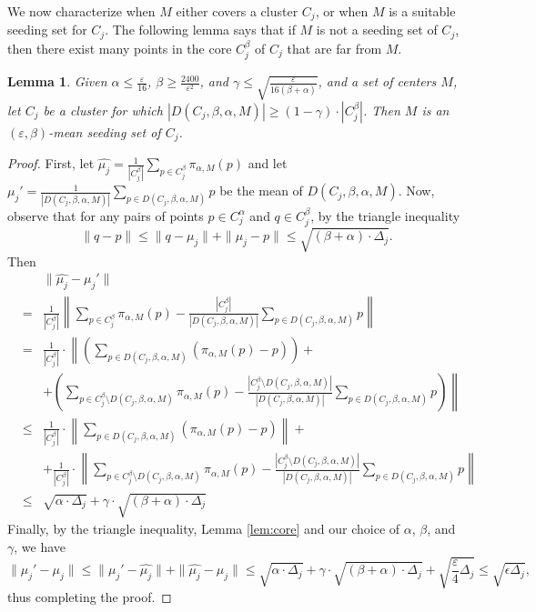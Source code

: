 \documentclass[11pt]{article}
\newtheorem{lemma}[theorem]{Lemma}
\begin{document}
We now characterize when $M$ either covers a cluster $C_j$, or when $M$ is a suitable seeding set for $C_j$. The following lemma says that if $M$ is not a seeding set of $C_j$, then there exist many points in the core $C_j^\beta$ of $C_j$ that are far from $M$.

\begin{lemma}
\label{lem:closecore}
    Given $\alpha\leq \frac{\varepsilon}{16}$, $\beta \geq \frac{2400}{\varepsilon^{2}}$, and $\gamma\leq \sqrt{\frac{\varepsilon}{16(\beta+\alpha)}}$,
    and a set of centers $M$, let $C_j$ be a cluster for which $|D(C_j,\beta,\alpha,M)| \geq (1-\gamma)\cdot |C_j^\beta|$. 
    Then $M$ is an $(\varepsilon,\beta)$-mean seeding set of $C_j$. 
\end{lemma}
\begin{proof}
    First, let $\hat{\mu_j} = \frac{1}{|C_j^\beta|}\sum_{p\in C_j^\beta}\pi_{\alpha,M}(p)$ and let 
    $\mu_j' = \frac{1}{|D(C_j,\beta,\alpha,M)|}\sum_{p\in D(C_j,\beta,\alpha,M)}p$ be the mean of $D(C_j,\beta,\alpha,M)$. 
    Now, observe that for any pairs of points $p\in C_j^\alpha$ and $q\in C_j^\beta$, by the triangle inequality 
    $$
    \|q-p\|\leq \|q - \mu_j\| + \|\mu_j - p\|\le \sqrt{(\beta+\alpha)\cdot \Delta_j}.
    $$
    Then
    \begin{eqnarray*}
        & & \|\hat{\mu_j}- \mu_j'\| \\
        & = & \frac{1}{|C_j^\beta|} \left\|\sum_{p\in C_j^\beta}\pi_{\alpha,M}(p) - \frac{|C_j^\beta|}{|D(C_j,\beta,\alpha,M)|}\sum_{p\in D(C_j,\beta,\alpha,M)}p\right\|\\
        & = &\frac{1}{|C_j^\beta|}\cdot \left\|\left(\sum_{p\in D(C_j,\beta,\alpha,M)}(\pi_{\alpha,M}(p)-p)\right)\right. + \\
        & & + \left.\left(\sum_{p\in C_j^\beta\setminus D(C_j,\beta,\alpha,M)}\pi_{\alpha,M}(p) - \frac{|C_j^\beta\setminus D(C_j,\beta,\alpha,M)|}{|D(C_j,\beta,\alpha,M)|}\sum_{p\in D(C_j,\beta,\alpha,M)}p\right)\right\|\\
        &\leq& \frac{1}{|C_j^\beta|}\cdot \left\|\sum_{p\in D(C_j,\beta,\alpha,M)}(\pi_{\alpha,M}(p)-p)\right\| + \\
        & & + \frac{1}{|C_j^\beta|}\cdot
        \left\|\sum_{p\in C_j^\beta\setminus D(C_j,\beta,\alpha,M)}\pi_{\alpha,M}(p) - \frac{|C_j^\beta\setminus D(C_j,\beta,\alpha,M)|}{|D(C_j,\beta,\alpha,M)|}\sum_{p\in D(C_j,\beta,\alpha,M)}p\right\| \\
        &\leq& \sqrt{\alpha \cdot \Delta_j} + \gamma\cdot \sqrt{(\beta+\alpha)\cdot \Delta_j}
    \end{eqnarray*}
    Finally, by the triangle inequality, Lemma \ref{lem:core} and our choice of $\alpha$, $\beta$, and $\gamma$, we have
    $$\|\mu_j'-\mu_j\|\leq \|\mu_j'-\hat{\mu_j}\| + \|\hat{\mu_j}-\mu_j\|\leq \sqrt{\alpha \cdot \Delta_j} + \gamma\cdot \sqrt{(\beta+\alpha)\cdot \Delta_j} + \sqrt{\frac{\varepsilon}{4}\Delta_j} \le \sqrt{\epsilon\Delta_j},$$
thus completing the proof.
\end{proof}
\end{document}
